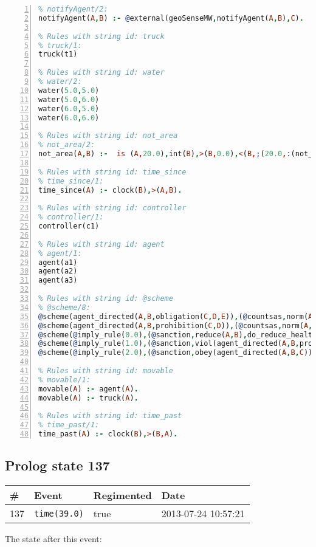 \documentclass[11pt]{article}\usepackage[utf8]{inputenc}\usepackage{geometry}
\begin{document}
\begin{lstlisting}[language=Prolog, numbers=left]
% Rules with string id: notifyAgent
% notifyAgent/2:
notifyAgent(A,B) :- @external(geoSenseMW,notifyAgent(A,B),C).

% Rules with string id: truck
% truck/1:
truck(t1)

% Rules with string id: water
% water/2:
water(5.0,5.0)
water(5.0,6.0)
water(6.0,5.0)
water(6.0,6.0)

% Rules with string id: not_area
% not_area/2:
not_area(A,B) :-  is (A,20.0),int(B),>(B,0.0),<(B,;(20.0,:(not_area(A,B), is (-(B),20.0)))),int(A),>(A,0.0),<(A,;(20.0,:(area(A,B),-(int(A))))),int(B),>(A,0.0),>(B,0.0),<(A,21.0),<(B,21.0).

% Rules with string id: time_since
% time_since/1:
time_since(A) :- clock(B),>(A,B).

% Rules with string id: controller
% controller/1:
controller(c1)

% Rules with string id: agent
% agent/1:
agent(a1)
agent(a2)
agent(a3)

% Rules with string id: @scheme
% @scheme/8:
@scheme(agent_directed(A,B,obligation(C,D,E)),(@countsas,norm(A,B,F,obligation(C,D,E)),F),false,(listTrue(C)),(time_past(D)),false,[plus(viol(agent_directed(A,B,obligation(C,D,E))))|[]],[plus(obey(agent_directed(A,B,obligation(C,D,E))))|[]])
@scheme(agent_directed(A,B,prohibition(C,D)),(@countsas,norm(A,B,E,prohibition(C,D)),E),(listTrue(C)),false,(false),false,[plus(viol(agent_directed(A,B,prohibition(C,D))))|[]],[plus(obey(agent_directed(A,B,prohibition(C,D))))|[]])
@scheme(@imply_rule(0.0),(@sanction,reduce(A,B),do_reduce_health(A,B),notifyAgent(A,changed(status))),true,false,false,false,[min(reduce(A,B))|[]],[])
@scheme(@imply_rule(1.0),(@sanction,viol(agent_directed(A,B,prohibition(C,D))),do_sanction(D)),true,false,false,false,[min(viol(agent_directed(A,B,prohibition(C,D))))|[]],[])
@scheme(@imply_rule(2.0),(@sanction,obey(agent_directed(A,B,C))),true,false,false,false,[min(obey(agent_directed(A,B,C)))|[]],[])

% Rules with string id: movable
% movable/1:
movable(A) :- agent(A).
movable(A) :- truck(A).

% Rules with string id: time_past
% time_past/1:
time_past(A) :- clock(B),>(B,A).

\end{lstlisting}
\clearpage 
\subsection{Prolog state 137}
\begin{table}[ht]
\centering 
\begin{tabular}{l l l l} 
\textbf{\#} & \textbf{Event} & \textbf{Regimented} & \textbf{Date} \\ [0.5ex] 
\hline
137&\texttt{time(39.0)}&true&2013-07-24 10:57:21\\ [1ex] \hline\end{tabular}
\end{table}
The state after this event:
\end{document}
